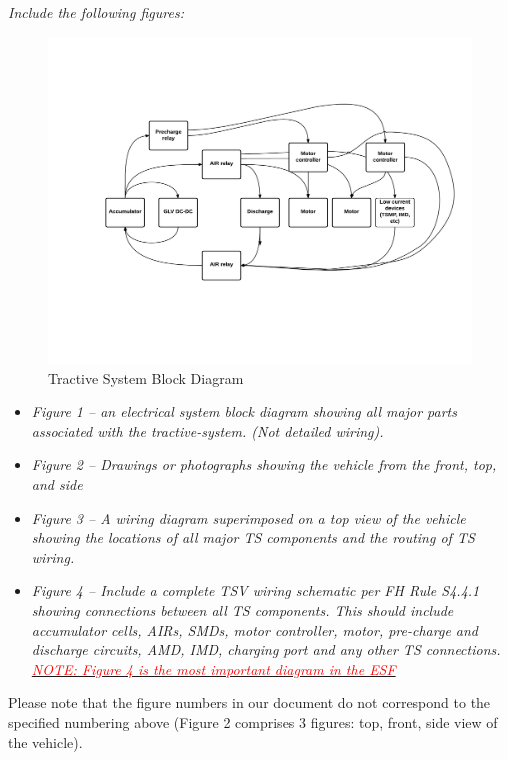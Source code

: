 \documentclass{article}
\begin{document}
        \textit{Include the following figures:}

 \begin{figure}
            \includegraphics[width=\textheight]{TSBLOCK}
            \caption{Tractive System Block Diagram}
            \label{tractiveblock}
        \end{figure}

        \begin{itemize}
            \item \textit{Figure 1 – an electrical system block diagram showing all major parts associated with the tractive-system. (Not detailed wiring).}
            \item \textit{Figure 2 – Drawings or photographs showing the vehicle from the front, top, and side}
            \item \textit{Figure 3 – A wiring diagram superimposed on a top view of the vehicle showing the locations of all major TS components and the routing of TS wiring.}
            \item \textit{Figure 4 -- Include a complete TSV wiring schematic per FH Rule S4.4.1 showing connections between all TS components. This should include accumulator cells, AIRs, SMDs, motor controller, motor, pre-charge and discharge circuits, AMD, IMD, charging port and any other TS connections. \underline{\textcolor{red}{NOTE: Figure 4 is the most important diagram in the ESF}}}
        \end{itemize}

Please note that the figure numbers in our document do not correspond to the specified numbering above (Figure 2 comprises 3 figures: top, front, side view of the vehicle).
\end{document}
